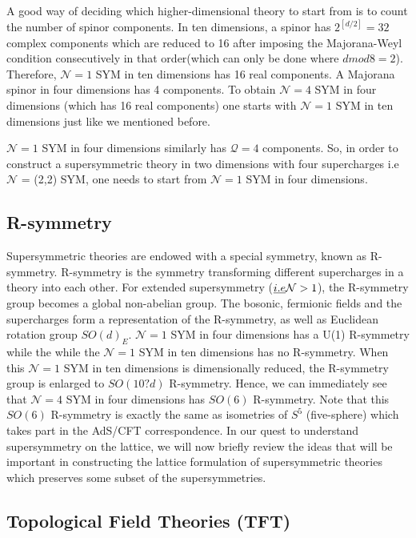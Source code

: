 A good way of deciding which higher-dimensional theory to start from is to count the number of spinor components.  
In ten dimensions, a spinor has $2^{[d/2]} = 32$ complex components which are reduced to 16 after imposing the 
Majorana-Weyl condition consecutively in that order(which can only be done where $d mod 8 = 2$). 
Therefore, $\mathcal{N}=1$ SYM in ten dimensions has 16 real components. 
A Majorana spinor in four dimensions has 4 components. To obtain
$\mathcal{N}=4$ SYM in four dimensions (which has 16 real components) 
one starts with $\mathcal{N}=1$ SYM in ten dimensions just like we mentioned before. 

$\mathcal{N}=1$ SYM in four dimensions similarly has $\mathcal{Q}=4$ components. 
So, in order to construct a supersymmetric theory in two dimensions with four supercharges i.e $\mathcal{N}$ = (2,2) SYM, 
one needs to start from $\mathcal{N}=1$ SYM in four dimensions. 


\subsection{R-symmetry} 

Supersymmetric theories are endowed with a special symmetry, known as R-symmetry. 
R-symmetry is the symmetry transforming different supercharges in a theory into each other. 
For extended supersymmetry ($\emph{i.e} \mathcal{N} > 1$), the R-symmetry group becomes a 
global non-abelian group. The bosonic, fermionic fields and the supercharges form a representation of the 
R-symmetry, as well as Euclidean rotation group $SO(d)_{E}$.
$\mathcal{N}=1$ SYM in four dimensions has a U(1) R-symmetry while the while the $\mathcal{N}=1$
SYM in ten dimensions has no R-symmetry. 
When this $\mathcal{N}=1$ SYM in ten dimensions is dimensionally reduced, 
the R-symmetry group is enlarged to $SO(10?d)$ R-symmetry. Hence, we can immediately 
see that $\mathcal{N}=4$ SYM in four dimensions has $SO(6)$ R-symmetry.
Note that this $SO(6)$ R-symmetry is exactly the same as isometries of $S^{5}$ (five-sphere) 
which takes part in the AdS/CFT correspondence. 
In our quest to understand supersymmetry on the lattice, we will now briefly review
the ideas that will be important in constructing the lattice formulation of supersymmetric theories
which preserves some subset of the supersymmetries. 



\subsection{Topological Field Theories (TFT)}


